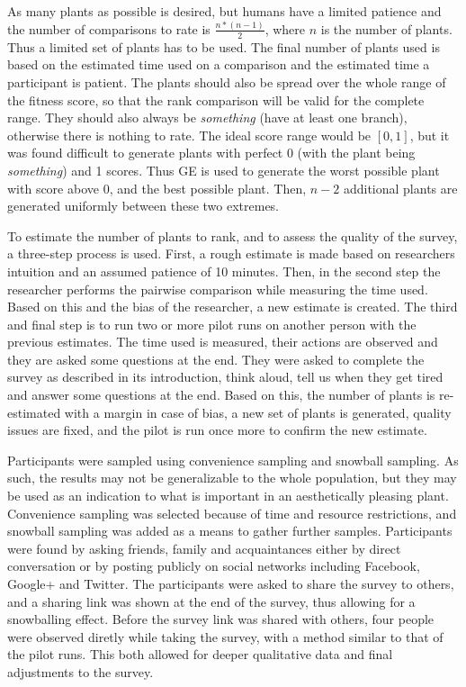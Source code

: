 As many plants as possible is desired, but humans have a limited patience and the number of comparisons to rate is $\frac{n * (n - 1)}{2}$, where $n$ is the number of plants.
Thus a limited set of plants has to be used.
The final number of plants used is based on the estimated time used on a comparison and the estimated time a participant is patient.
The plants should also be spread over the whole range of the fitness score, so that the rank comparison will be valid for the complete range.
They should also always be \textit{something} (have at least one branch), otherwise there is nothing to rate.
The ideal score range would be $[0, 1]$, but it was found difficult to generate plants with perfect 0 (with the plant being \textit{something}) and 1 scores.
Thus GE is used to generate the worst possible plant with score above 0, and the best possible plant.
Then, $n - 2$ additional plants are generated uniformly between these two extremes.


To estimate the number of plants to rank, and to assess the quality of the survey, a three-step process is used.
First, a rough estimate is made based on researchers intuition and an assumed patience of 10 minutes.
Then, in the second step the researcher performs the pairwise comparison while measuring the time used.
Based on this and the bias of the researcher, a new estimate is created.
The third and final step is to run two or more pilot runs on another person with the previous estimates.
The time used is measured, their actions are observed and they are asked some questions at the end.
They were asked to complete the survey as described in its introduction, think aloud, tell us when they get tired and answer some questions at the end.
Based on this, the number of plants is re-estimated with a margin in case of bias, a new set of plants is generated, quality issues are fixed, and the pilot is run once more to confirm the new estimate.

Participants were sampled using convenience sampling and snowball sampling.
As such, the results may not be generalizable to the whole population, but they may be used as an indication to what is important in an aesthetically pleasing plant.
Convenience sampling was selected because of time and resource restrictions, and snowball sampling was added as a means to gather further samples.
Participants were found by asking friends, family and acquaintances either by direct conversation or by posting publicly on social networks including Facebook, Google+ and Twitter.
The participants were asked to share the survey to others, and a sharing link was shown at the end of the survey, thus allowing for a snowballing effect.
Before the survey link was shared with others, four people were observed diretly while taking the survey, with a method similar to that of the pilot runs.
This both allowed for deeper qualitative data and final adjustments to the survey.

